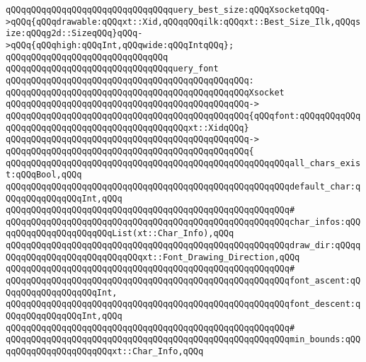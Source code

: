\newline
\verb|qQQqqQQqqQQqqQQqqQQqqQQqqQQqqQQqquery_best_size:qQQqXsocketqQQq->qQQq{qQQqdrawable:qQQqxt::Xid,qQQqqQQqilk:qQQqxt::Best_Size_Ilk,qQQqsize:qQQqg2d::SizeqQQq}qQQq->qQQq{qQQqhigh:qQQqInt,qQQqwide:qQQqIntqQQq};|\newline
\verb|qQQqqQQqqQQqqQQqqQQqqQQqqQQqqQQq|\newline
\verb|qQQqqQQqqQQqqQQqqQQqqQQqqQQqqQQqquery_font|\newline
\verb|qQQqqQQqqQQqqQQqqQQqqQQqqQQqqQQqqQQqqQQqqQQqqQQq:|\newline
\verb|qQQqqQQqqQQqqQQqqQQqqQQqqQQqqQQqqQQqqQQqqQQqqQQqXsocket|\newline
\verb|qQQqqQQqqQQqqQQqqQQqqQQqqQQqqQQqqQQqqQQqqQQqqQQq->|\newline
\verb|qQQqqQQqqQQqqQQqqQQqqQQqqQQqqQQqqQQqqQQqqQQqqQQq{qQQqfont:qQQqqQQqqQQqqQQqqQQqqQQqqQQqqQQqqQQqqQQqqQQqqQQqxt::XidqQQq}|\newline
\verb|qQQqqQQqqQQqqQQqqQQqqQQqqQQqqQQqqQQqqQQqqQQqqQQq->|\newline
\verb|qQQqqQQqqQQqqQQqqQQqqQQqqQQqqQQqqQQqqQQqqQQqqQQq{|\newline
\verb|qQQqqQQqqQQqqQQqqQQqqQQqqQQqqQQqqQQqqQQqqQQqqQQqqQQqqQQqall_chars_exist:qQQqBool,qQQq|\newline
\verb|qQQqqQQqqQQqqQQqqQQqqQQqqQQqqQQqqQQqqQQqqQQqqQQqqQQqqQQqdefault_char:qQQqqQQqqQQqqQQqInt,qQQq|\newline
\verb|qQQqqQQqqQQqqQQqqQQqqQQqqQQqqQQqqQQqqQQqqQQqqQQqqQQqqQQq#|\newline
\verb|qQQqqQQqqQQqqQQqqQQqqQQqqQQqqQQqqQQqqQQqqQQqqQQqqQQqqQQqchar_infos:qQQqqQQqqQQqqQQqqQQqqQQqList(xt::Char_Info),qQQq|\newline
\verb|qQQqqQQqqQQqqQQqqQQqqQQqqQQqqQQqqQQqqQQqqQQqqQQqqQQqqQQqdraw_dir:qQQqqQQqqQQqqQQqqQQqqQQqqQQqqQQqxt::Font_Drawing_Direction,qQQq|\newline
\verb|qQQqqQQqqQQqqQQqqQQqqQQqqQQqqQQqqQQqqQQqqQQqqQQqqQQqqQQq#|\newline
\verb|qQQqqQQqqQQqqQQqqQQqqQQqqQQqqQQqqQQqqQQqqQQqqQQqqQQqqQQqfont_ascent:qQQqqQQqqQQqqQQqqQQqInt,|\newline
\verb|qQQqqQQqqQQqqQQqqQQqqQQqqQQqqQQqqQQqqQQqqQQqqQQqqQQqqQQqfont_descent:qQQqqQQqqQQqqQQqInt,qQQq|\newline
\verb|qQQqqQQqqQQqqQQqqQQqqQQqqQQqqQQqqQQqqQQqqQQqqQQqqQQqqQQq#|\newline
\verb|qQQqqQQqqQQqqQQqqQQqqQQqqQQqqQQqqQQqqQQqqQQqqQQqqQQqqQQqmin_bounds:qQQqqQQqqQQqqQQqqQQqqQQqxt::Char_Info,qQQq|\newline
